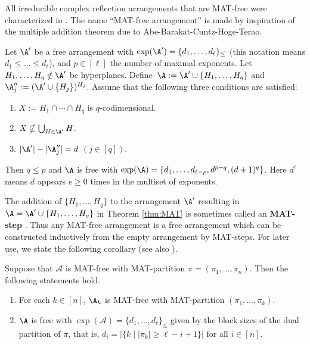 All irreducible complex reflection arrangements that are MAT-free were characterized in  \cite{CM20}.
The name ``MAT-free arrangement'' is made by inspiration of the multiple addition theorem due to Abe-Barakat-Cuntz-Hoge-Terao. 
\begin{theorem}
\label{thm:MAT}
Let $\A'$ be a free arrangement with  $\exp(\A') =\{d_1, \ldots, d_\ell\}_{\le}$ (this notation means $d_{1}\le \dots\le d_{\ell}$), and $p \in [\ell]$ the number of maximal exponents.
 Let $H_1,\ldots,H_q\notin \A'$ be hyperplanes. Define~$\A:=\A'\cup\{H_1,\ldots,H_q\}$ and $\A''_j:=(\A'\cup\{H_j\})^{H_j}$.
Assume that the following three conditions are satisfied:
\begin{enumerate}[label=(\arabic*)]
\item $X:=H_1 \cap \cdots \cap H_q$ is $q$-codimensional.
\item  $X \nsubseteq \bigcup_{H \in \A'}H$. 
\item $|\A'|- |\A_j''|=d$ $(j \in [q])$.
\end{enumerate}
Then $q \le p$ and $\A$ is free with $\exp(\A)=\{d_1, \ldots, d_{\ell-p}, d^{p-q},(d+1)^q\}$.
Here $d^e$ means $d$ appears $e\ge0$ times  in the multiset of exponents.
\end{theorem}

The addition of  $\{H_1,\ldots,H_q\}$ to the arrangement $\A'$ resulting in $\A=\A'\cup\{H_1,\ldots,H_q\}$ in Theorem \ref{thm:MAT} is sometimes called an \textbf{MAT-step} \cite[Definition 2.11]{MR21}.
Thus any MAT-free arrangement is a free arrangement which can be constructed inductively from the empty arrangement by MAT-steps. 
For later use, we state the following corollary (see also \cite[Remark 2.15]{MR21}).
\begin{corollary}
\label{cor:MAT}
Suppose that $ \mathcal{A} $ is MAT-free with MAT-partition $ \pi=(\pi_{1}, \dots, \pi_{n}) $. 
Then the following statements hold. 
\begin{enumerate}[(1)]
\item For each  $ k \in [n] $, $\A_k$ is MAT-free with MAT-partition $(\pi_{1}, \dots, \pi_{k}) $.
\item $\A$ is free with $ \exp(\mathcal{A}) = \{d_{1}, \dots, d_{\ell}\}_{\leq} $ given by the block sizes of the dual partition of  $ \pi$, that is, $ d_{i} =|\{k \mid |\pi_{k}| \geq \ell-i+1\} |$ for all $i \in [n].$
\end{enumerate}
\end{corollary}





